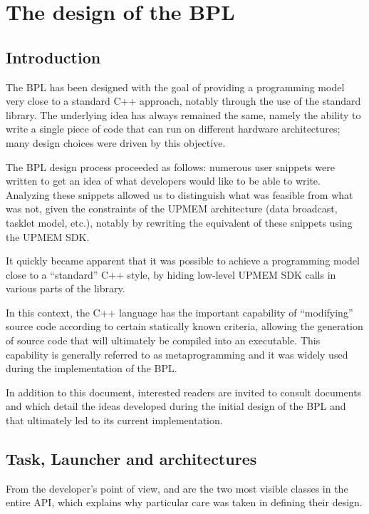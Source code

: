 %
\chapter{The design of the BPL}

\section{Introduction}

The BPL has been designed with the goal of providing a programming model very close to a standard C++ approach, 
notably through the use of the standard library.
The underlying idea has always remained the same, namely the ability to write a single piece of code 
that can run on different hardware architectures; many design choices were driven by this objective.

The BPL design process proceeded as follows: numerous user snippets were written to get an idea of what developers
 would like to be able to write. Analyzing these snippets allowed us to distinguish what was feasible from what was not,
  given the constraints of the UPMEM architecture (data broadcast, tasklet model, etc.), notably by rewriting the 
  equivalent of these snippets using the UPMEM SDK.

It quickly became apparent that it was possible to achieve a programming model close to a “standard” C++ style,
 by hiding low-level UPMEM SDK calls in various parts of the library.

In this context, the C++ language has the important capability of “modifying” source code according to certain 
statically known criteria, allowing the generation of source code that will ultimately be compiled into an executable. 
This capability is generally referred to as metaprogramming and it was widely used during the implementation of the BPL.

In addition to this document, interested readers are invited to consult documents  and
which detail the ideas developed during the initial design of the BPL and that ultimately led to its current implementation.

\section{Task, Launcher and architectures}
From the developer’s point of view,  and  are the two most visible classes in the entire \BPL API, 
which explains why particular care was taken in defining their design.

